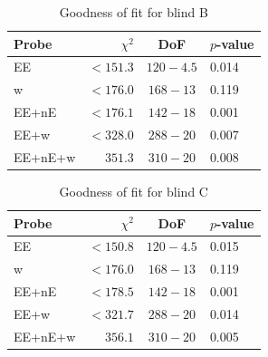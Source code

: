 \begin{table}
	\begin{center}
		\caption{Goodness of fit for blind B}
		\label{tab:goodness-of-fit}
\begin{tabular}{lrcl}
    \toprule
    Probe             & $\chi^2$       & DoF       & $p$-value   \\
    \midrule
	EE               & $< 151.3$ & $120-4.5$ & 0.014 \\
	w                & $< 176.0$ & $168-13$ & 0.119 \\
	EE+nE            & $< 176.1$ & $142-18$ & 0.001 \\
	EE+w             & $< 328.0$ & $288-20$ & 0.007 \\
	EE+nE+w          & $351.3$ & $310-20$ & 0.008 \\

    \bottomrule
\end{tabular}
	\end{center}
\end{table}

\begin{table}
	\begin{center}
		\caption{Goodness of fit for blind C}
		\label{tab:goodness-of-fit}
\begin{tabular}{lrcl}
    \toprule
    Probe             & $\chi^2$       & DoF       & $p$-value   \\
    \midrule
	EE               & $< 150.8$ & $120-4.5$ & 0.015 \\
	w                & $< 176.0$ & $168-13$ & 0.119 \\
	EE+nE            & $< 178.5$ & $142-18$ & 0.001 \\
	EE+w             & $< 321.7$ & $288-20$ & 0.014 \\
	EE+nE+w          & $356.1$ & $310-20$ & 0.005 \\

    \bottomrule
\end{tabular}
	\end{center}
\end{table}

